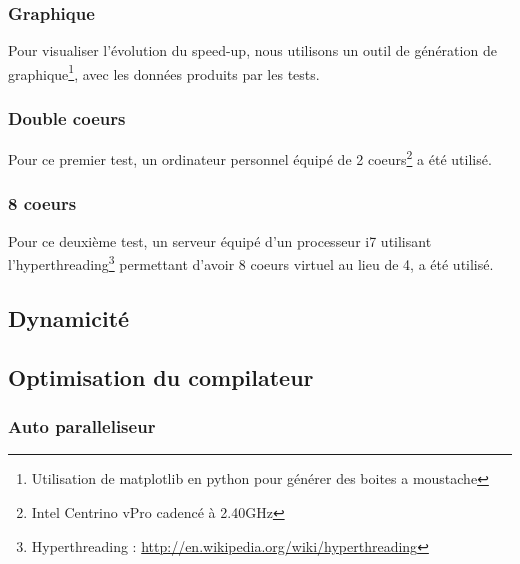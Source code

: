 \subsubsection{Graphique}

Pour visualiser l'évolution du speed-up, nous utilisons un outil de génération de graphique\footnote{Utilisation de matplotlib en python pour générer des boites a moustache}, avec les données produits par les tests.

\subsubsection{Double coeurs}

Pour ce premier test, un ordinateur personnel équipé de 2 coeurs\footnote{Intel Centrino vPro cadencé à 2.40GHz} a été utilisé.

\subsubsection{8 coeurs}

Pour ce deuxième test, un serveur équipé d'un processeur i7 utilisant l'hyperthreading\footnote{Hyperthreading : \url{http://en.wikipedia.org/wiki/hyperthreading}} permettant d'avoir 8 coeurs virtuel au lieu de 4, a été utilisé.

\subsection{Dynamicité}

\subsection{Optimisation du compilateur}

\subsubsection{Auto paralleliseur}
